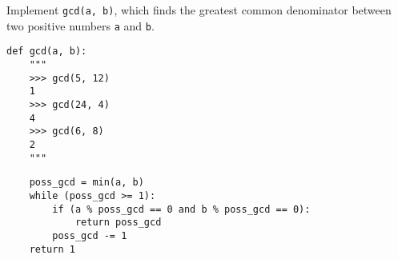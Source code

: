 \begin{blocksection}
\question Implement \lstinline$gcd(a, b)$, which finds the greatest common denominator between two positive numbers \lstinline$a$ and \lstinline$b$.

\begin{lstlisting}
def gcd(a, b):
    """
    >>> gcd(5, 12)
    1
    >>> gcd(24, 4)
    4
    >>> gcd(6, 8)
    2
    """
\end{lstlisting}
\begin{solution}[2in]
\begin{lstlisting}
    poss_gcd = min(a, b)
    while (poss_gcd >= 1):
        if (a % poss_gcd == 0 and b % poss_gcd == 0):
            return poss_gcd
        poss_gcd -= 1
    return 1
\end{lstlisting}
\end{solution}
\end{blocksection}
